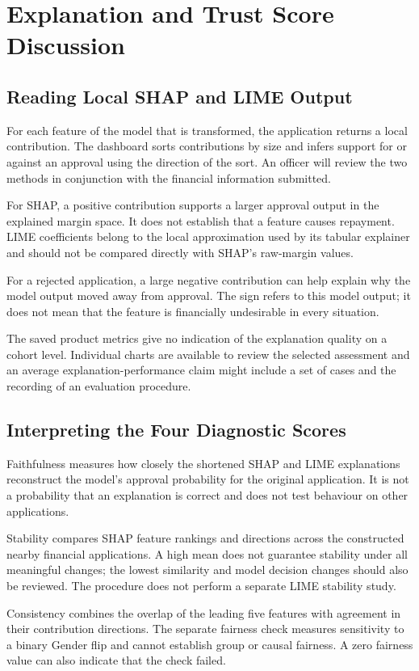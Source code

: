 \section{Explanation and Trust Score Discussion}
\subsection{Reading Local SHAP and LIME Output}
For each feature of the model that is transformed, the application returns a local contribution. The dashboard sorts contributions by size and infers support for or against an approval using the direction of the sort. An officer will review the two methods in conjunction with the financial information submitted.

For SHAP, a positive contribution supports a larger approval output in the explained margin space. It does not establish that a feature causes repayment. LIME coefficients belong to the local approximation used by its tabular explainer and should not be compared directly with SHAP's raw-margin values.

For a rejected application, a large negative contribution can help explain why the model output moved away from approval. The sign refers to this model output; it does not mean that the feature is financially undesirable in every situation.

The saved product metrics give no indication of the explanation quality on a cohort level. Individual charts are available to review the selected assessment and an average explanation-performance claim might include a set of cases and the recording of an evaluation procedure.

\subsection{Interpreting the Four Diagnostic Scores}
Faithfulness measures how closely the shortened SHAP and LIME explanations reconstruct the model's approval probability for the original application. It is not a probability that an explanation is correct and does not test behaviour on other applications.

Stability compares SHAP feature rankings and directions across the constructed nearby financial applications. A high mean does not guarantee stability under all meaningful changes; the lowest similarity and model decision changes should also be reviewed. The procedure does not perform a separate LIME stability study.

Consistency combines the overlap of the leading five features with agreement in their contribution directions. The separate fairness check measures sensitivity to a binary Gender flip and cannot establish group or causal fairness. A zero fairness value can also indicate that the check failed.

